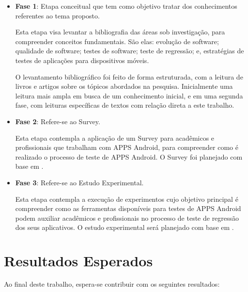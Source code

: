 \begin{itemize}
  \item \textbf{Fase 1}: Etapa conceitual que tem como objetivo tratar dos conhecimentos referentes ao tema proposto.
  
  
  Esta etapa visa levantar a bibliografia das áreas sob investigação, para compreender conceitos fundamentais. São elas: evolução de software; qualidade de software; testes de software; teste de regressão; e, estratégias de testes de aplicações para dispositivos móveis.
  
  O levantamento bibliográfico foi feito de forma estruturada, com a leitura de livros e artigos sobre os tópicos abordados na pesquisa. Inicialmente uma leitura mais ampla em busca de um conhecimento inicial, e em uma segunda fase, com leituras específicas de textos com relação direta a este trabalho.
  
  \item \textbf{Fase 2}: Refere-se ao Survey.
  
  Esta etapa contempla a aplicação de um Survey para acadêmicos e profissionais que trabalham com \ac{APPS} Android, para compreender como é realizado o processo de teste de \ac{APPS} Android. O Survey foi planejado com base em \cite{Kitchenham:2002:PSR:566493.566495}.
  
  \item \textbf{Fase 3}: Refere-se ao Estudo Experimental.
  
  Esta etapa contempla a execução de experimentos cujo objetivo principal é compreender como as ferramentas disponíveis para testes de \ac{APPS} Android podem auxiliar acadêmicos e profissionais no processo de teste de regressão dos seus aplicativos. O estudo experimental será planejado com base em \cite{Wohlin:2012:ESE:2349018}.
  
\end{itemize}


\section{Resultados Esperados}\label{sec:resultadosesperados}

Ao final deste trabalho, espera-se contribuir com os seguintes resultados:


